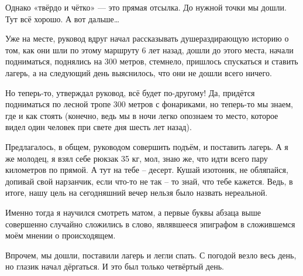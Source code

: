 Однако «твёрдо и чётко» — это прямая отсылка. До нужной точки мы дошли. Тут всё хорошо. А вот дальше…

Уже на месте, руковод вдруг начал рассказывать душераздирающую историю о том, как они шли по этому маршруту 6 лет назад, дошли до этого места, начали подниматься, поднялись на 300 метров, стемнело, пришлось спускаться и ставить лагерь, а на следующий день выяснилось, что они не дошли всего ничего.

Но теперь-то, утверждал руковод, всё будет по-другому! Да, придётся подниматься по лесной тропе 300 метров с фонариками, но теперь-то мы знаем, где и как стоять (конечно, ведь мы в ночи легко опознаем то место, которое видел один человек при свете дня шесть лет назад).

Предлагалось, в общем, руководом совершить подъём, 
и поставить лагерь. А я же молодец, я взял себе рюкзак 35 кг, мол, знаю же, что идти всего пару километров по прямой. А тут на тебе – десерт. Кушай изотоник, не обляпайся, допивай свой нарзанчик, если что-то не так – то знай, что тебе кажется. Ведь, в итоге, нашу цель на сегодняшний вечер нельзя было назвать нереальной.

Именно тогда я научился смотреть матом, а первые буквы абзаца выше совершенно случайно сложились в слово, являвшееся эпиграфом в сложившемся моём мнении о происходящем.

Впрочем, мы дошли, поставили лагерь и легли спать. С погодой везло весь день, но глазик начал дёргаться. И это был только четвёртый день.

\clearpage

\label{ilya}